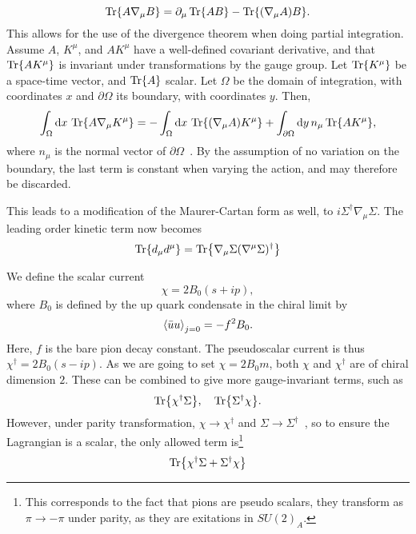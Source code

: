 \begin{equation*}
    \Tr{A \nabla_\mu B} = \partial_\mu \Tr{AB} - \Tr{(\nabla_\mu A) B}.
\end{equation*}
This allows for the use of the divergence theorem when doing partial integration.
Assume $A$, $K^\mu$, and $A K^\mu$ have a well-defined covariant derivative, and that $\Tr{A K^\mu}$ is invariant under transformations by the gauge group.
Let $\Tr{K^\mu}$ be a space-time vector, and $\Tr{A}$ scalar. 
Let $\Omega$ be the domain of integration, with coordinates $x$ and $\partial \Omega$ its boundary, with coordinates $y$. Then, 
\begin{align*}
    \int_\Omega \dd x \, \Tr{A \nabla_\mu K^\mu} 
    = 
    - \int_\Omega \dd x \, \Tr{(\nabla_\mu A) K^\mu}
    + \int_{\partial\Omega} \dd y\, n_\mu \Tr{A K^\mu},
\end{align*}
where $n_\mu$ is the normal vector of $\partial \Omega$~\cite{Carroll:spacetime}.
By the assumption of no variation on the boundary, the last term is constant when varying the action, and may therefore be discarded.

This leads to a modification of the Maurer-Cartan form as well, to $i \Sigma^\dagger \nabla_\mu \Sigma$.
The leading order kinetic term now becomes
\begin{equation}
    \label{leading order term sigma}
    \Tr{d_\mu d^\mu} = \Tr{\nabla_\mu \Sigma (\nabla^\mu \Sigma)^\dagger}
\end{equation}

We define the scalar current
\begin{equation}
    \chi = 2 B_0 (s + ip),
\end{equation}
where $B_0$ is defined by the up quark condensate in the chiral limit by
\begin{equation}
    \ex{\bar u u}_{j = 0} = - f^2 B_0.
\end{equation}
Here, $f$ is the bare pion decay constant.
The pseudoscalar current is thus $\chi^\dagger = 2 B_0 (s - ip)$.
As we are going to set $\chi = 2 B_0 m$, both $\chi$ and $\chi^\dagger$ are of chiral dimension $2$.
These can be combined to give more gauge-invariant terms, such as
\begin{equation}
    \Tr{\chi^\dagger \Sigma}, \quad \Tr{\Sigma^\dagger \chi}.
\end{equation}
However, under parity transformation, $\chi \rightarrow \chi^\dagger$ and $\Sigma \rightarrow \Sigma^\dagger$~\cite{Scherer2002IntroductionTC}, so to ensure the Lagrangian is a scalar, the only allowed term is\footnote{This corresponds to the fact that pions are pseudo scalars, they transform as $\pi \rightarrow - \pi$ under parity, as they are exitations in $SU(2)_A$.}
\begin{equation}
    \label{leading order chi sigma term}
    \Tr{\chi^\dagger \Sigma + \Sigma^\dagger \chi}
\end{equation}

